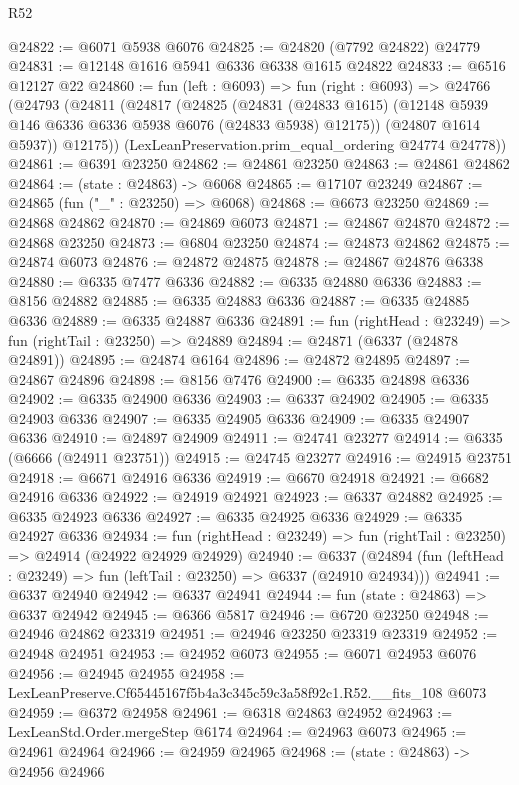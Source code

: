 \begin{lexlean}{R52}
\begin{coremodule}
@24822 := @6071 @5938 @6076
@24825 := @24820 (@7792 @24822) @24779
@24831 := @12148 @1616 @5941 @6336 @6338 @1615 @24822
@24833 := @6516 @12127 @22
@24860 := fun (left : @6093) =>
  fun (right : @6093) =>
  @24766
    (@24793
      (@24811
        (@24817
          (@24825
            (@24831
              (@24833 @1615)
              (@12148 @5939 @146 @6336 @6336 @5938 @6076 (@24833 @5938) @12175))
            (@24807 @1614 @5937))
          @12175))
      (LexLeanPreservation.prim_equal_ordering @24774 @24778))
@24861 := @6391 @23250
@24862 := @24861 @23250
@24863 := @24861 @24862
@24864 := (state : @24863) -> @6068
@24865 := @17107 @23249
@24867 := @24865 (fun ("_" : @23250) => @6068)
@24868 := @6673 @23250
@24869 := @24868 @24862
@24870 := @24869 @6073
@24871 := @24867 @24870
@24872 := @24868 @23250
@24873 := @6804 @23250
@24874 := @24873 @24862
@24875 := @24874 @6073
@24876 := @24872 @24875
@24878 := @24867 @24876 @6338
@24880 := @6335 @7477 @6336
@24882 := @6335 @24880 @6336
@24883 := @8156 @24882
@24885 := @6335 @24883 @6336
@24887 := @6335 @24885 @6336
@24889 := @6335 @24887 @6336
@24891 := fun (rightHead : @23249) => fun (rightTail : @23250) => @24889
@24894 := @24871 (@6337 (@24878 @24891))
@24895 := @24874 @6164
@24896 := @24872 @24895
@24897 := @24867 @24896
@24898 := @8156 @7476
@24900 := @6335 @24898 @6336
@24902 := @6335 @24900 @6336
@24903 := @6337 @24902
@24905 := @6335 @24903 @6336
@24907 := @6335 @24905 @6336
@24909 := @6335 @24907 @6336
@24910 := @24897 @24909
@24911 := @24741 @23277
@24914 := @6335 (@6666 (@24911 @23751))
@24915 := @24745 @23277
@24916 := @24915 @23751
@24918 := @6671 @24916 @6336
@24919 := @6670 @24918
@24921 := @6682 @24916 @6336
@24922 := @24919 @24921
@24923 := @6337 @24882
@24925 := @6335 @24923 @6336
@24927 := @6335 @24925 @6336
@24929 := @6335 @24927 @6336
@24934 := fun (rightHead : @23249) => fun (rightTail : @23250) => @24914 (@24922 @24929 @24929)
@24940 := @6337
    (@24894 (fun (leftHead : @23249) => fun (leftTail : @23250) => @6337 (@24910 @24934)))
@24941 := @6337 @24940
@24942 := @6337 @24941
@24944 := fun (state : @24863) => @6337 @24942
@24945 := @6366 @5817
@24946 := @6720 @23250
@24948 := @24946 @24862 @23319
@24951 := @24946 @23250 @23319 @23319
@24952 := @24948 @24951
@24953 := @24952 @6073
@24955 := @6071 @24953 @6076
@24956 := @24945 @24955
@24958 := LexLeanPreserve.Cf65445167f5b4a3c345c59c3a58f92c1.R52.__fits_108 @6073
@24959 := @6372 @24958
@24961 := @6318 @24863 @24952
@24963 := LexLeanStd.Order.mergeStep @6174
@24964 := @24963 @6073
@24965 := @24961 @24964
@24966 := @24959 @24965
@24968 := (state : @24863) -> @24956 @24966

\end{coremodule}
\end{lexlean}
